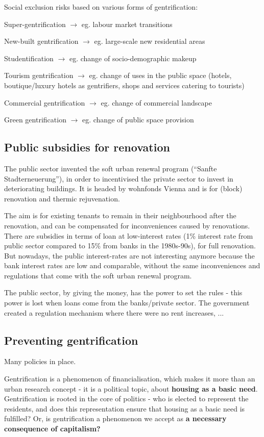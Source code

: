 \documentclass{article}
\begin{document}
Social exclusion risks based on various forms of gentrification:

Super-gentrification $\rightarrow$ eg. labour market transitions

New-built gentrification $\rightarrow$ eg. large-scale new residential areas

Studentification $\rightarrow$ eg. change of socio-demographic makeup

Tourism gentrification $\rightarrow$ eg. change of uses in the public space (hotels, boutique/luxury hotels as gentrifiers, shops and services catering to tourists)

Commercial gentrification $\rightarrow$ eg. change of commercial landscape

Green gentrification $\rightarrow$ eg. change of public space provision

\subsection{Public subsidies for renovation}

The public sector invented the soft urban renewal program (``Sanfte Stadterneuerung''), in order to incentivised the private sector to invest in deteriorating buildings.
 It is headed by wohnfonds Vienna and is for (block) renovation and thermic rejuvenation. 

The aim is for existing tenants to remain in their neighbourhood after the renovation, and can be compensated for inconveniences caused by renovations. There are subsidies in terms of loan at low-interest rates (1\% interest rate from public sector compared to 15\% from banks in the 1980s-90s), for full renovation. But nowadays, the public interest-rates are not interesting anymore because the bank interest rates are low and comparable, without the same inconveniences and regulations that come with the soft urban renewal program.

The public sector, by giving the money, has the power to set the rules - this power is lost when loans come from the banks/private sector. The government created a regulation mechanism where there were no rent increases, ...

\subsection{Preventing gentrification}

Many policies in place. 

Gentrification is a phenomenon of financialisation, which makes it more than an urban research concept - it is a political topic, about \textbf{housing as a basic need}. Gentrification is rooted in the core of politics - who is elected to represent the residents, and does this representation ensure that housing as a basic need is fulfilled? Or, is gentrification a phenomenon we accept as \textbf{a necessary consequence of capitalism?} 
\end{document}
